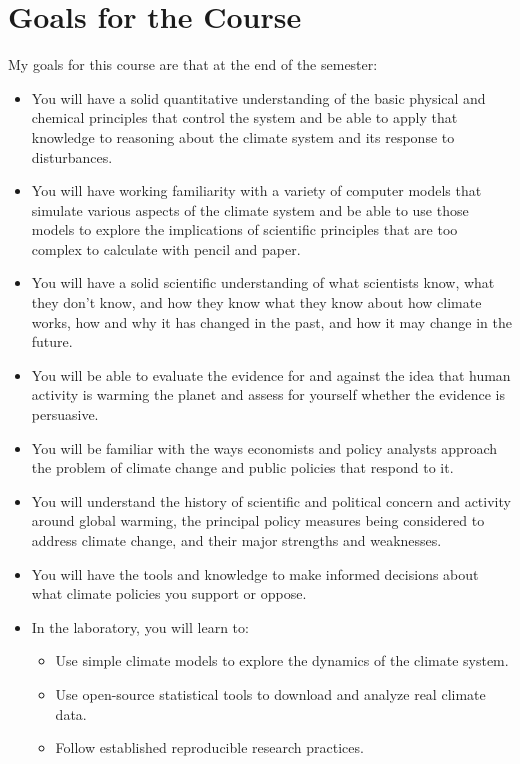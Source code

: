\documentclass[11pt,twoside]{jgsyllabus}\usepackage[]{graphicx}\usepackage[]{color}
\begin{document}
\section[Goals]{Goals for the Course}
My goals for this course are that at the end of the semester:
\begin{itemize}
  \item You will have a solid quantitative understanding of the basic physical
    and chemical principles that control the system and be able to apply that
    knowledge to reasoning about the climate system and its response to
    disturbances.
  \item You will have working familiarity with a variety of computer models that
    simulate various aspects of the climate system and be able to use those
    models to explore the implications of scientific principles that are too
    complex to calculate with pencil and paper.
  \item You will have a solid scientific understanding of what scientists know,
    what they don't know, and how they know what they know about how climate
    works, how and why it has changed in the past, and how it may change in the
    future.
  \item You will be able to evaluate the evidence for and against the idea that
    human activity is warming the planet and assess for yourself whether the
    evidence is persuasive.
  \item You will be familiar with the ways economists and policy analysts
    approach the problem of climate change and public policies that respond to
    it.
  \item You will understand the history of scientific and political concern and
    activity around global warming, the principal policy measures being
    considered to address climate change, and their major strengths and
    weaknesses.
  \item You will have the tools and knowledge to make informed decisions about
    what climate policies you support or oppose.
\item In the laboratory, you will learn to:
  \begin{itemize}
    \item Use simple climate models to explore the dynamics of the climate
      system.
    \item Use open-source statistical tools to download and analyze real climate
      data.
    \item Follow established reproducible research practices.
  \end{itemize}
\end{itemize}
\end{document}
